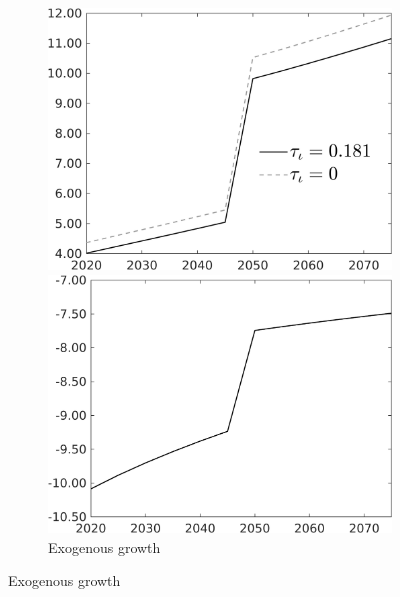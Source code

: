 \begin{figure}[h!!]
	\begin{subfigure}{0.9\textwidth}
		\caption{Exogenous growth}
		\begin{minipage}[]{0.45\textwidth}
			\includegraphics[width=1\textwidth]{../../codding_model/own_basedOnFried/optimalPol_010922_revision/figures/all_13Sept22/CompTauf_bytaul_Reg0_tauf_spillover0_nsk1_xgr0_knspil0_sep0_LFlimit1_emsbase0_countec0_GovRev0_etaa0.79_lgd1.png}
		\end{minipage}	
		\begin{minipage}[]{0.45\textwidth}
			\includegraphics[width=1\textwidth]{../../codding_model/own_basedOnFried/optimalPol_010922_revision/figures/all_13Sept22/CompTaufPER_bytaul_Reg0_tauf_spillover0_nsk0_xgr1_knspil0_sep0_LFlimit1_emsbase0_countec0_GovRev0_etaa0.79_lgd0.png} 
		\end{minipage}	
	\end{subfigure}	
\end{figure}
